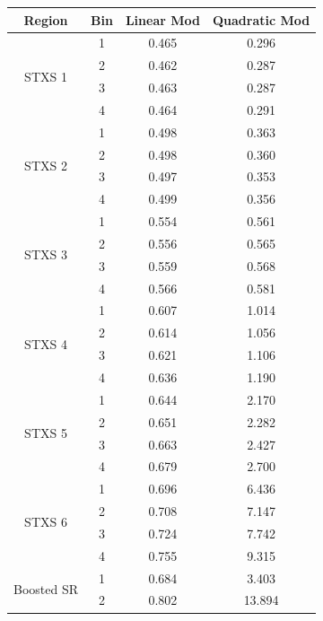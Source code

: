 \begin{tabular}{|c|c|c|c|}
\hline
\textbf{Region} & \textbf{Bin} & \textbf{Linear Mod} & \textbf{Quadratic Mod} \\
\hline
\multirow{4}{*}{STXS 1} & 1 & 0.465 & 0.296 \\
 & 2 & 0.462 & 0.287 \\
 & 3 & 0.463 & 0.287 \\
 & 4 & 0.464 & 0.291 \\
\hline
\multirow{4}{*}{STXS 2} & 1 & 0.498 & 0.363 \\
 & 2 & 0.498 & 0.360 \\
 & 3 & 0.497 & 0.353 \\
 & 4 & 0.499 & 0.356 \\
\hline
\multirow{4}{*}{STXS 3} & 1 & 0.554 & 0.561 \\
 & 2 & 0.556 & 0.565 \\
 & 3 & 0.559 & 0.568 \\
 & 4 & 0.566 & 0.581 \\
\hline
\multirow{4}{*}{STXS 4} & 1 & 0.607 & 1.014 \\
 & 2 & 0.614 & 1.056 \\
 & 3 & 0.621 & 1.106 \\
 & 4 & 0.636 & 1.190 \\
\hline
\multirow{4}{*}{STXS 5} & 1 & 0.644 & 2.170 \\
 & 2 & 0.651 & 2.282 \\
 & 3 & 0.663 & 2.427 \\
 & 4 & 0.679 & 2.700 \\
\hline
\multirow{4}{*}{STXS 6} & 1 & 0.696 & 6.436 \\
 & 2 & 0.708 & 7.147 \\
 & 3 & 0.724 & 7.742 \\
 & 4 & 0.755 & 9.315 \\
\hline
\multirow{2}{*}{Boosted SR} & 1 & 0.684 & 3.403 \\
 & 2 & 0.802 & 13.894 \\
\hline
\end{tabular}
